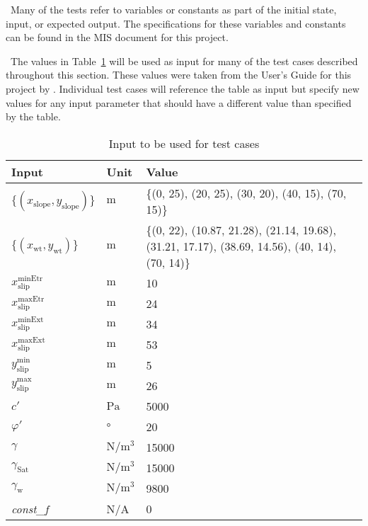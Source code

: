 \documentclass[12pt, titlepage]{article}
\begin{document}
~\newline \noindent Many of the tests refer to variables or constants as part 
of the initial state, input, or expected output. The specifications for these 
variables and constants can be found in the MIS document for this project.

~\newline \noindent The values in Table~\ref{Inputs} will be used as input for 
many of the test cases described throughout this section. These values were 
taken from the User's Guide for this project by \cite{UserGuide}. Individual 
test cases will reference the table as input but specify new values for any 
input parameter that should have a different value than specified by the table.

\begin{table}[!h]
	\renewcommand{\arraystretch}{1.5}
	\begin{tabularx}{1.0\textwidth}{p{3cm} l X}
		\toprule \textbf{Input} &
		\textbf{Unit} & \textbf{Value}\\ \midrule
		$\{\left(x_\text{slope},y_\text{slope}\right)\}$ & $\text{m}$ & \{(0, 
		25), 
		(20, 25), (30, 20), (40, 15), (70, 15)\}\\
		$\{\left(x_\text{wt},y_\text{wt}\right)\}$ & $\text{m}$ & \{(0, 22), 
		(10.87, 21.28), (21.14, 19.68), (31.21, 17.17), (38.69, 14.56), (40, 
		14), (70, 14)\}\\
		${x_\text{slip}^\text{minEtr}}$ & $\text{m}$ & 10\\
		${x_\text{slip}^\text{maxEtr}}$ & $\text{m}$ & 24\\
		${x_\text{slip}^\text{minExt}}$ & $\text{m}$ & 34\\
		${x_\text{slip}^\text{maxExt}}$ & $\text{m}$ & 53\\
		${y_\text{slip}^\text{min}}$ & $\text{m}$ & 5\\
		${y_\text{slip}^\text{max}}$ & $\text{m}$ & 26\\
		$c'$ & $\si{\pascal}$ & 5000 \\
		$\varphi'$ & \si{\degree} & 20\\
		$\gamma$ & $\si{\newton\per\meter\cubed}$ & 15000 \\
		$\gamma_{\text{Sat}}$ & $\si{\newton\per\meter\cubed}$ & 15000 \\
		$\gamma_{\text{w}}$ & $\si{\newton\per\meter\cubed}$ & 9800 \\
		\textit{const\_f} & N/A & 0\\ 
		\bottomrule
	\end{tabularx}
	\caption{Input to be used for test cases}
	\label{Inputs}
\end{table}
\end{document}
